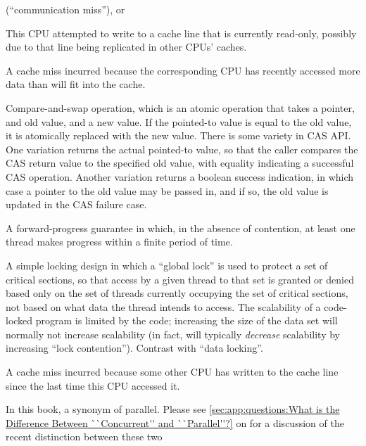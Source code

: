 \begin{description}
\begin{enumerate*}[(1)]
	(``communication miss''), or
	\item This CPU attempted to write to a cache line that is
	currently read-only, possibly due to that line being replicated
	in other CPUs' caches.
	\end{enumerate*}
\item[\IXGalth{Capacity Miss}{capacity}{cache miss}:]
	A cache miss incurred because the corresponding CPU has recently
	accessed more data than will fit into the cache.
\item[CAS:]
	Compare-and-swap operation, which is an atomic operation that
	takes a pointer, and old value, and a new value.
	If the pointed-to value is equal to the old value, it is atomically
	replaced with the new value.
	There is some variety in CAS API\@.
	One variation returns the actual pointed-to value, so that the
	caller compares the CAS return value to the specified old value,
	with equality indicating a successful CAS operation.
	Another variation returns a boolean success indication, in which
	case a pointer to the old value may be passed in, and if so,
	the old value is updated in the CAS failure case.
\item[\IXG{Clash Free}:]
	A forward-progress guarantee in which, in the absence of
	contention, at least one thread makes progress within a finite
	period of time.
\item[\IXGalth{Code Locking}{code}{locking}:]
	A simple locking design in which a ``global lock'' is used to protect
	a set of critical sections, so that access by a given thread
	to that set is
	granted or denied based only on the set of threads currently
	occupying the set of critical sections, not based on what
	data the thread intends to access.
	The scalability of a code-locked program is limited by the code;
	increasing the size of the data set will normally not increase
	scalability (in fact, will typically \emph{decrease} scalability
	by increasing ``lock contention'').
	Contrast with ``data locking''.
\item[\IXGalth{Communication Miss}{communication}{cache miss}:]
	A cache miss incurred because some other CPU has written to
	the cache line since the last time this CPU accessed it.
\item[\IXG{Concurrent}:]
	In this book, a synonym of parallel.
	Please see \cref{sec:app:questions:What is the Difference Between ``Concurrent'' and ``Parallel''?}
	on 
	for a discussion of the recent distinction between these two

\end{description}
